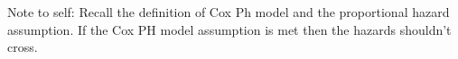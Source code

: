 \documentclass{article}
\begin{document}
%
%
%
%
%

\ir[4.1] Note to self: Recall the definition of Cox Ph model and the proportional hazard assumption. If the Cox PH model assumption is met then the hazards shouldn't cross. 
\end{document}

